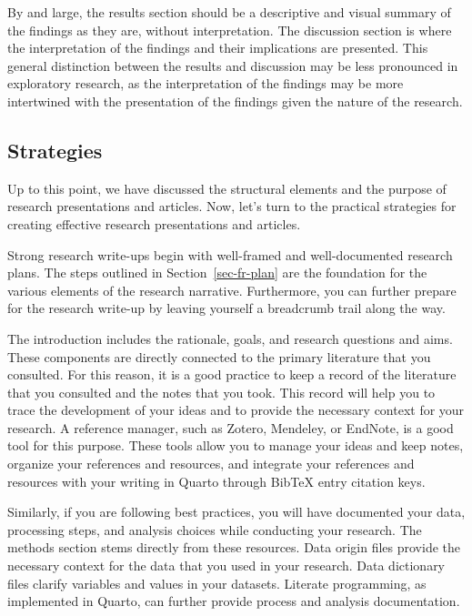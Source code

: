 \documentclass[
  letterpaper,
]{latex/krantz}
\theoremstyle{definition}
\theoremstyle{remark}
\begin{document}
By and large, the results section should be a descriptive and visual
summary of the findings as they are, without interpretation. The
discussion section is where the interpretation of the findings and their
implications are presented. This general distinction between the results
and discussion may be less pronounced in exploratory research, as the
interpretation of the findings may be more intertwined with the
presentation of the findings given the nature of the research.

\subsection{Strategies}\label{sec-contr-ao-strategies}

Up to this point, we have discussed the structural elements and the
purpose of research presentations and articles. Now, let's turn to the
practical strategies for creating effective research presentations and
articles.

Strong research write-ups begin with well-framed and well-documented
research plans. The steps outlined in Section~\ref{sec-fr-plan} are the
foundation for the various elements of the research narrative.
Furthermore, you can further prepare for the research write-up by
leaving yourself a breadcrumb trail along the way.

The introduction includes the rationale, goals, and research questions
and aims. These components are directly connected to the primary
literature that you consulted. For this reason, it is a good practice to
keep a record of the literature that you consulted and the notes that
you took. This record will help you to trace the development of your
ideas and to provide the necessary context for your research. A
reference manager, such as Zotero, Mendeley, or EndNote, is a good tool
for this purpose. These tools allow you to manage your ideas and keep
notes, organize your references and resources, and integrate your
references and resources with your writing in Quarto through BibTeX
entry citation keys.

Similarly, if you are following best practices, you will have documented
your data, processing steps, and analysis choices while conducting your
research. The methods section stems directly from these resources. Data
origin files provide the necessary context for the data that you used in
your research. Data dictionary files clarify variables and values in
your datasets. Literate programming, as implemented in Quarto, can
further provide process and analysis documentation.
\end{document}
